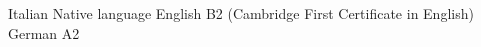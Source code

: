 

\begin{cvhonors}

  \cvskill
    {Italian}
  {Native language}
  \cvskill
    {English}
    {B2 (Cambridge First Certificate in English)}
\cvskill
    {German}
    {A2}

\end{cvhonors}
